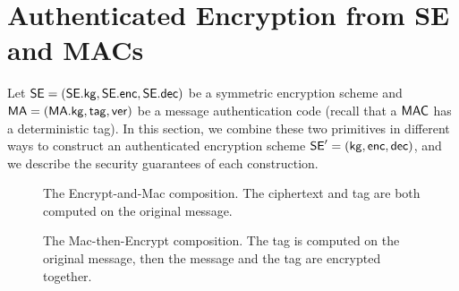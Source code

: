 \section{Authenticated Encryption from SE and MACs}
\label{sec:genericcomp}
Let ${\mathsf{SE}}=({\mathsf{SE}}.{\sf kg},{\mathsf{SE}}.{\sf enc},{\mathsf{SE}}.{\sf dec})$ be a symmetric encryption scheme and $\mathsf{MA}=(\mathsf{MA}.{\sf kg},\mathsf{tag},\mathsf{ver})$ be a message authentication code (recall that a $\mathsf{MAC}$ has a deterministic tag). In this section, we combine these two primitives in different ways to construct an authenticated encryption scheme ${\mathsf{SE}}'=({\sf kg},{\sf enc},{\sf dec})$, and we describe the security guarantees of each construction. 
\begin{figure}[h]
	\centering
	\caption{The Encrypt-and-Mac composition. The ciphertext and tag are both computed on the original message.}
\end{figure}
\begin{figure}[h]
	\centering
	\caption{The Mac-then-Encrypt composition. The tag is computed on the original message, then the message and the tag are encrypted together.}
\end{figure}
